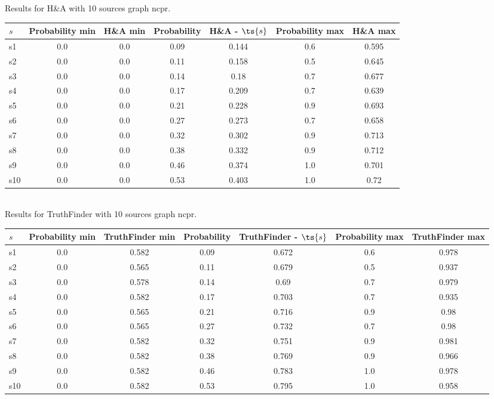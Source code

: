 \documentclass{article}
\begin{document}
\noindent Results for H\&A with 10 sources graph ncpr.

\noindent\begin{tabular}{|l|c|c|c|c|c|c|}
\hline
$s$& Probability min & H\&A min & Probability & H\&A - $\ts{s}$ & Probability max & H\&A max\\
\hline
s1 &0.0 & 0.0 & 0.09 & 0.144 & 0.6 & 0.595\\
\hline
s2 &0.0 & 0.0 & 0.11 & 0.158 & 0.5 & 0.645\\
\hline
s3 &0.0 & 0.0 & 0.14 & 0.18 & 0.7 & 0.677\\
\hline
s4 &0.0 & 0.0 & 0.17 & 0.209 & 0.7 & 0.639\\
\hline
s5 &0.0 & 0.0 & 0.21 & 0.228 & 0.9 & 0.693\\
\hline
s6 &0.0 & 0.0 & 0.27 & 0.273 & 0.7 & 0.658\\
\hline
s7 &0.0 & 0.0 & 0.32 & 0.302 & 0.9 & 0.713\\
\hline
s8 &0.0 & 0.0 & 0.38 & 0.332 & 0.9 & 0.712\\
\hline
s9 &0.0 & 0.0 & 0.46 & 0.374 & 1.0 & 0.701\\
\hline
s10 &0.0 & 0.0 & 0.53 & 0.403 & 1.0 & 0.72\\
\hline
\end{tabular}\\

\noindent Results for TruthFinder with 10 sources graph ncpr.

\noindent\begin{tabular}{|l|c|c|c|c|c|c|}
\hline
$s$& Probability min & TruthFinder min & Probability & TruthFinder - $\ts{s}$ & Probability max & TruthFinder max\\
\hline
s1 &0.0 & 0.582 & 0.09 & 0.672 & 0.6 & 0.978\\
\hline
s2 &0.0 & 0.565 & 0.11 & 0.679 & 0.5 & 0.937\\
\hline
s3 &0.0 & 0.578 & 0.14 & 0.69 & 0.7 & 0.979\\
\hline
s4 &0.0 & 0.582 & 0.17 & 0.703 & 0.7 & 0.935\\
\hline
s5 &0.0 & 0.565 & 0.21 & 0.716 & 0.9 & 0.98\\
\hline
s6 &0.0 & 0.565 & 0.27 & 0.732 & 0.7 & 0.98\\
\hline
s7 &0.0 & 0.582 & 0.32 & 0.751 & 0.9 & 0.981\\
\hline
s8 &0.0 & 0.582 & 0.38 & 0.769 & 0.9 & 0.966\\
\hline
s9 &0.0 & 0.582 & 0.46 & 0.783 & 1.0 & 0.978\\
\hline
s10 &0.0 & 0.582 & 0.53 & 0.795 & 1.0 & 0.958\\
\hline
\end{tabular}\\
\end{document}
